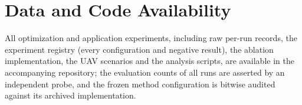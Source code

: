 \documentclass[journal]{IEEEtran}
\begin{document}
\section*{Data and Code Availability}
All optimization and application experiments, including raw per-run records,
the experiment registry (every configuration and negative result), the
ablation implementation, the UAV scenarios and the analysis scripts, are
available in the accompanying repository; the evaluation counts of all runs
are asserted by an independent probe, and the frozen method configuration is
bitwise audited against its archived implementation.



\end{document}
